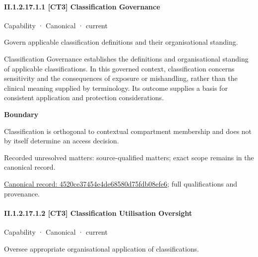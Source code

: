 \paragraph*{II.1.2.17.1.1 [CT3] Classification Governance}
\label{navigation:II.1.2.17.1.1}

\label{element:4520ce37454e4de68580d75fdb08efe6}
{\small Capability · Canonical · current}\par

Govern applicable classification definitions and their organisational standing.



Classification Governance establishes the definitions and organisational standing of applicable classifications. In this governed context, classification concerns sensitivity and the consequences of exposure or mishandling, rather than the clinical meaning supplied by terminology. Its outcome supplies a basis for consistent application and protection considerations.



\textbf{Boundary}



Classification is orthogonal to contextual compartment membership and does not by itself determine an access decision.


{\small Recorded unresolved matters: source-qualified matters; exact scope remains in the canonical record.}\par
{\footnotesize \href{../../../../../../../continuum/strategy/capability/4520ce37454e4de68580d75fdb08efe6.md}{Canonical record: 4520ce37454e4de68580d75fdb08efe6}; full qualifications and provenance.}\par
\paragraph*{II.1.2.17.1.2 [CT3] Classification Utilisation Oversight}
\label{navigation:II.1.2.17.1.2}

\label{element:1d7c50aa80464613864dd6efb3fb56cc}
{\small Capability · Canonical · current}\par

Oversee appropriate organisational application of classifications.



